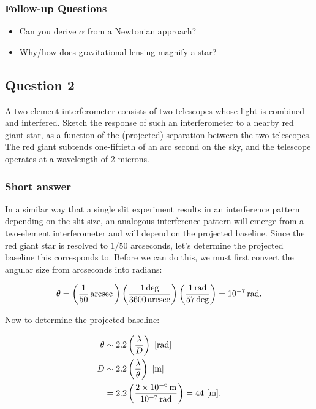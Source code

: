 \documentclass[a4paper,10pt]{article}
\begin{document}
\subsubsection{Follow-up Questions}

\begin{itemize}
    \item Can you derive $\alpha$ from a Newtonian approach?
    \item Why/how does gravitational lensing magnify a star?
\end{itemize}


\newpage
\subsection{Question 2}

A two-element interferometer consists of two telescopes whose light is combined and interfered. Sketch the response of such an interferometer to a nearby red giant star, as a function of the (projected) separation between the two telescopes. The red giant subtends one-fiftieth of an arc second on the sky, and the telescope operates at a wavelength of 2 microns.

\subsubsection{Short answer}

In a similar way that a single slit experiment results in an interference pattern depending on the slit size, an analogous interference pattern will emerge from a two-element interferometer and will depend on the projected baseline. Since the red giant star is resolved to $1/50$ arcseconds, let's determine the projected baseline this corresponds to. Before we can do this, we must first convert the angular size from arcseconds into radians:

\begin{align*}
    \theta = \left(\frac{1}{50}\,{\rm arcsec}\,\right) \left(\frac{1\,{\rm deg}}{3600\,{\rm arcsec}}\right) \left(\frac{1\,{\rm rad}}{57\,{\rm deg}}\right) = 10^{-7}\,{\rm rad}.
\end{align*}

{\noindent}Now to determine the projected baseline:

\begin{align*}
    \theta &\sim 2.2\left(\frac{\lambda}{D}\right) ~ [{\rm rad}] \\
         D &\sim 2.2\left(\frac{\lambda}{\theta}\right) ~ [{\rm m}] \\
           &= 2.2\left(\frac{2\times10^{-6}\,{\rm m}}{10^{-7}\,{\rm rad}}\right) = 44 ~ [{\rm m}].
\end{align*}
\end{document}
